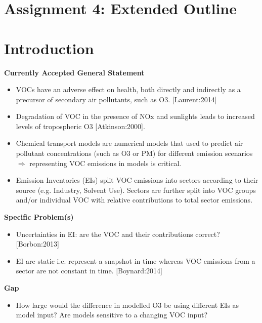 \documentclass[14pt]{extarticle}
\begin{document}
\section*{Assignment 4: Extended Outline}

\begin{center}
     \par
\end{center}

\section{Introduction}

\textbf{Currently Accepted General Statement}
\begin{itemize}
    \item VOCs have an adverse effect on health, both directly and indirectly as a precursor of secondary air pollutants, such as O3. [Laurent:2014]
    \item Degradation of VOC in the presence of NOx and sunlights leads to increased levels of tropospheric O3 [Atkinson:2000].
    \item Chemical transport models are numerical models that used to predict air pollutant concentrations (such as O3 or PM) for different emission scenarios $\Rightarrow$ representing VOC emissions in models is critical.
    \item Emission Inventories (EIs) split VOC emissions into sectors according to their source (e.g. Industry, Solvent Use). Sectors are further split into VOC groups and/or individual VOC with relative contributions to total sector emissions. 
\end{itemize}

\textbf{Specific Problem(s)}
\begin{itemize}
    \item Uncertainties in EI: are the VOC and their contributions correct? [Borbon:2013]
    \item EI are static i.e. represent a snapshot in time whereas VOC emissions from a sector are not constant in time. [Boynard:2014]
\end{itemize}

\textbf{Gap}
\begin{itemize}
    \item How large would the difference in modelled O3 be using different EIs as model input? Are models sensitive to a changing VOC input?
\end{itemize}
\end{document}
